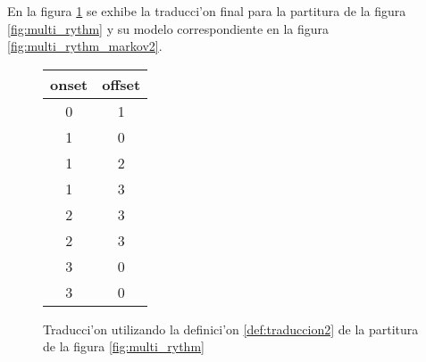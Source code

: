 En la figura \ref{fig:multi_rythm_translation2} se exhibe la traducci'on final para la 
partitura de la figura \ref{fig:multi_rythm} y su modelo correspondiente en la figura \ref{fig:multi_rythm_markov2}.

\begin{figure}[!h]
\begin{center}
\begin{tabular}{c | c} 
onset & offset \\
\hline
0 & 1 \\
1 & 0 \\
1 & 2 \\
1 & 3 \\
2 & 3 \\
2 & 3 \\
3 & 0 \\
3 & 0 \\
\end{tabular}
\caption{ Traducci'on utilizando la definici'on \ref{def:traduccion2} de la partitura de la figura \ref{fig:multi_rythm}}
\label{fig:multi_rythm_translation2}

\end{center}
\end{figure}

\begin{imagen}
    \width{7cm}
\end{imagen}

